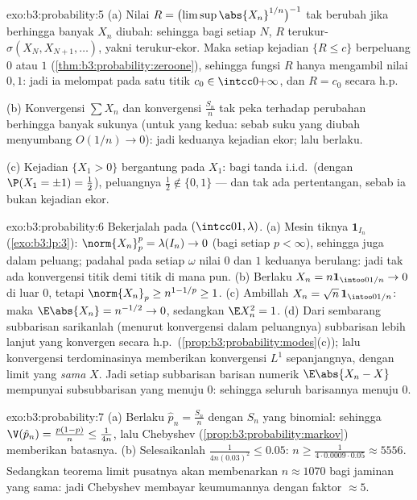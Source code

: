 \begin{solution}{exo:b3:probability:5}
(a) Nilai $R = \bigl(\limsup\abs{X_n}^{1/n}\bigr)^{-1}$ tak
berubah jika berhingga banyak $X_n$ diubah: sehingga bagi setiap $N$,
$R$ terukur-$\sigma(X_N, X_{N+1}, \dots)$, yakni
terukur-ekor. Maka setiap kejadian $\{R \leq c\}$ berpeluang
$0$ atau $1$ (\cref{thm:b3:probability:zeroone}),
sehingga fungsi  $R$ hanya mengambil nilai
$0, 1$: jadi ia melompat pada satu titik $c_0 \in
\intcc0{+\infty}$, dan $R = c_0$ secara h.p.

(b) Konvergensi $\sum X_n$ dan konvergensi $\frac{S_n}n$ tak
peka terhadap perubahan berhingga banyak sukunya (untuk yang kedua:
sebab suku yang diubah menyumbang $O(1/n) \to 0$): jadi keduanya kejadian ekor;
lalu  berlaku.

(c) Kejadian $\{X_1 > 0\}$ bergantung pada $X_1$: bagi tanda i.i.d.\
(dengan $\P(X_1 = \pm1) = \frac12$), peluangnya $\frac12
\notin \{0,1\}$ --- dan tak ada pertentangan, sebab ia bukan kejadian
ekor.
\end{solution}

\begin{solution}{exo:b3:probability:6}
Bekerjalah pada $(\intcc01, \lambda)$.
(a) Mesin tiknya $\mathbf 1_{I_n}$
(\cref{exo:b3:lp:3}): $\norm{X_n}_p^p = \lambda(I_n) \to 0$
(bagi setiap $p < \infty$), sehingga juga dalam peluang; padahal pada setiap
$\omega$ nilai $0$ dan $1$ keduanya berulang: jadi tak ada konvergensi
titik demi titik di mana pun.
(b) Berlaku $X_n = n\mathbf 1_{\intoo0{1/n}} \to 0$ di luar $0$, tetapi
$\norm{X_n}_p \geq n^{1 - 1/p} \geq 1$.
(c) Ambillah $X_n = \sqrt n\,\mathbf 1_{\intoo0{1/n}}$: maka $\E\abs{X_n} =
n^{-1/2} \to 0$, sedangkan $\E X_n^2 = 1$.
(d) Dari sembarang subbarisan sarikanlah (menurut konvergensi dalam
peluangnya) subbarisan lebih lanjut yang konvergen secara h.p.\
(\cref{prop:b3:probability:modes}(c)); lalu konvergensi terdominasinya
memberikan konvergensi $L^1$ sepanjangnya, dengan limit yang \emph{sama}
$X$. Jadi setiap subbarisan barisan numerik
$\E\abs{X_n - X}$ mempunyai subsubbarisan yang menuju $0$: sehingga
seluruh barisannya menuju $0$.
\end{solution}

\begin{solution}{exo:b3:probability:7}
(a) Berlaku $\hat p_n = \frac{S_n}n$ dengan $S_n$ yang binomial: sehingga $\V(\hat
p_n) = \frac{p(1-p)}n \leq \frac1{4n}$, lalu Chebyshev
(\cref{prop:b3:probability:markov}) memberikan batasnya.
(b) Selesaikanlah $\frac1{4n(0.03)^2} \leq 0.05$: $n \geq
\frac{1}{4\cdot0.0009\cdot0.05} \approx 5556$. Sedangkan teorema
limit pusatnya akan membenarkan $n \approx 1070$ bagi jaminan yang sama:
jadi Chebyshev membayar keumumannya dengan faktor
$\approx 5$.
\end{solution}


